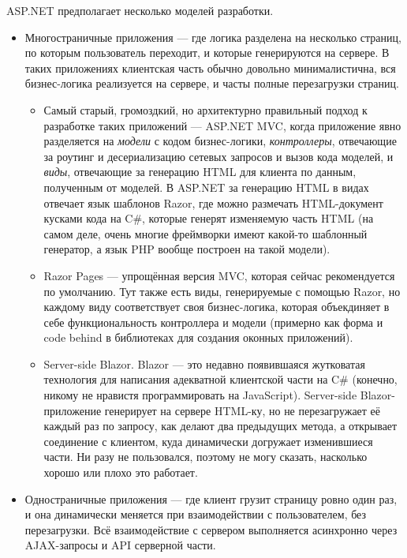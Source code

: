 \documentclass[a5paper]{article}
\begin{document}
ASP.NET предполагает несколько моделей разработки.

\begin{itemize}
    \item Многостраничные приложения --- где логика разделена на несколько страниц, по которым пользователь переходит, и которые генерируются на сервере. В таких приложениях клиентская часть обычно довольно минималистична, вся бизнес-логика реализуется на сервере, и часты полные перезагрузки страниц.
    \begin{itemize}
        \item Самый старый, громоздкий, но архитектурно правильный подход к разработке таких приложений --- ASP.NET MVC, когда приложение явно разделяется на \emph{модели} с кодом бизнес-логики, \emph{контроллеры}, отвечающие за роутинг и десериализацию сетевых запросов и вызов кода моделей, и \emph{виды}, отвечающие за генерацию HTML для клиента по данным, полученным от моделей. В ASP.NET за генерацию HTML в видах отвечает язык шаблонов Razor, где можно размечать HTML-документ кусками кода на C\#, которые генерят изменяемую часть HTML (на самом деле, очень многие фреймворки имеют какой-то шаблонный генератор, а язык PHP вообще построен на такой модели).
        \item Razor Pages --- упрощённая версия MVC, которая сейчас рекомендуется по умолчанию. Тут также есть виды, генерируемые с помощью Razor, но каждому виду соответствует своя бизнес-логика, которая объекдиняет в себе функциональность контроллера и модели (примерно как форма и code behind в библиотеках для создания оконных приложений).
        \item Server-side Blazor. Blazor --- это недавно появившаяся жутковатая технология для написания адекватной клиентской части на C\# (конечно, никому не нравистя программировать на JavaScript). Server-side Blazor-приложение генерирует на сервере HTML-ку, но не перезагружает её каждый раз по запросу, как делают два предыдущих метода, а открывает соединение с клиентом, куда динамически догружает изменившиеся части. Ни разу не пользовался, поэтому не могу сказать, насколько хорошо или плохо это работает.
    \end{itemize}
    \item Одностраничные приложения --- где клиент грузит страницу ровно один раз, и она динамически меняется при взаимодействии с пользователем, без перезагрузки. Всё взаимодействие с сервером выполняется асинхронно через AJAX-запросы и API серверной части.
    \begin{itemize}

\end{itemize}
\end{itemize}
\end{document}
